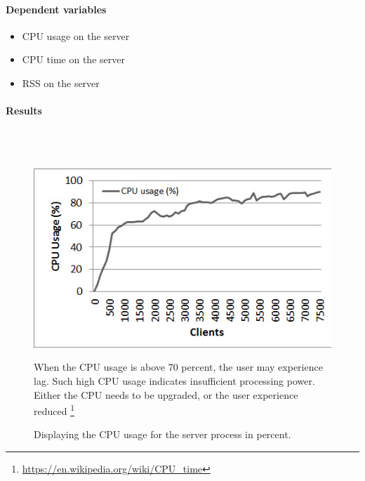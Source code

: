 \documentclass[12pt]{article}
\begin{document}
\paragraph{Dependent variables}
\begin{itemize}
\item CPU usage on the server
\item CPU time on the server
\item RSS on the server
\end{itemize}

\paragraph{Results}\mbox{}\\\\

\begin{center}

\begin{figure}
\label{fig:cpu_usage}
\includegraphics[scale=0.75]{test_CLIENT_CPUusage.jpg}
\caption{Displaying the CPU usage for the server process in percent.}
\vspace{1em}
When the CPU usage is above 70 percent, the user may experience lag. Such high CPU usage indicates insufficient processing power. Either the CPU needs to be upgraded, or the user experience reduced 
\footnote{\url{https://en.wikipedia.org/wiki/CPU_time}}
\end{figure}



\end{center}
\end{document}
